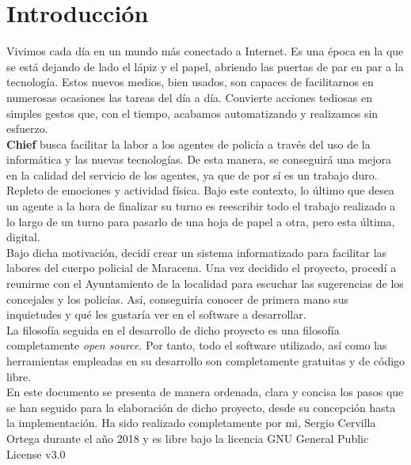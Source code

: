 \chapter{Introducción}

Vivimos cada día en un mundo más conectado a Internet. Es una época en la que se está dejando de 
lado el lápiz y el papel, abriendo las puertas de par en par a la tecnología. Estos nuevos medios, bien
usados, son capaces de facilitarnos en numerosas ocasiones las tareas del día a día. Convierte acciones
tediosas en simples gestos que, con el tiempo, acabamos automatizando y realizamos sin esfuerzo.\\ 

\textbf{Chief} busca facilitar la labor a los agentes de policía a través del uso de la informática y las nuevas tecnologías. De esta manera, se conseguirá una mejora en la calidad del servicio de los agentes, ya que de por sí es un 
trabajo duro. Repleto de emociones y actividad física. Bajo este contexto, lo último que desea un
agente a la hora de finalizar su turno es reescribir todo el trabajo realizado a lo largo de un 
turno para pasarlo de una hoja de papel a otra, pero esta última, digital.\\ 

Bajo dicha motivación, decidí crear un sistema informatizado para facilitar las labores del cuerpo 
policial de Maracena. Una vez decidido el proyecto, procedí a reunirme con el Ayuntamiento de la 
localidad para escuchar las sugerencias de los  concejales y los policías. Así, conseguiría conocer de 
primera mano  sus inquietudes y qué les gustaría ver en el software a desarrollar.\\

La filosofía seguida en el desarrollo de dicho proyecto es una filosofía completamente \textit{open source}.
Por tanto, todo el software utilizado, así como las herramientas empleadas en su desarrollo son completamente
gratuitas y de código libre.\\ 

En este documento se presenta de manera ordenada, clara y concisa los pasos que se han seguido para
la elaboración de dicho proyecto, desde su concepción hasta la implementación. Ha sido realizado completamente por mi, Sergio Cervilla Ortega durante 
el año 2018 y es libre bajo la licencia GNU General Public License v3.0 \cite{gplv3}\\ 


